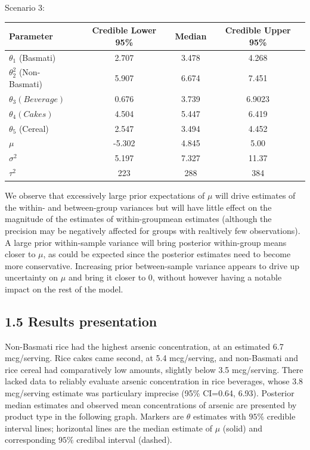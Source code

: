\documentclass[]{article}
\begin{document}
Scenario 3:

\begin{center}
  \begin{tabular}{l c c c}
  \hline Parameter & Credible Lower 95\% & Median & Credible Upper 95\% \\ \hline
    $\theta_1$ (Basmati)& 2.707 & 3.478 & 4.268\\
    $\theta_2^2$ (Non-Basmati)& 5.907 & 6.674 & 7.451 \\
    $\theta_3 (Beverage)$& 0.676 & 3.739 & 6.9023 \\
    $\theta_4 (Cakes)$& 4.504 & 5.447 & 6.419\\
    $\theta_5$ (Cereal)& 2.547 & 3.494 & 4.452\\
    $\mu$ &-5.302 & 4.845 & 5.00\\
    $\sigma^2$ &5.197 & 7.327 & 11.37\\
    $\tau^2$ &223 & 288 & 384\\ \hline
  \end{tabular}
\end{center}

We observe that excessively large prior expectations of \(\mu\) will
drive estimates of the within- and between-group variances but will have
little effect on the magnitude of the estimates of within-groupmean
estimates (although the precision may be negatively affected for groups
with realtively few observations). A large prior within-sample variance
will bring posterior within-group means closer to \(\mu\), as could be
expected since the posterior estimates need to become more conservative.
Increasing prior between-sample variance appears to drive up uncertainty
on \(\mu\) and bring it closer to \(0\), without however having a
notable impact on the rest of the model.

\subsection{1.5 Results presentation}

Non-Basmati rice had the highest arsenic concentration, at an estimated
6.7 mcg/serving. Rice cakes came second, at 5.4 mcg/serving, and
non-Basmati and rice cereal had comparatively low amounts, slightly
below 3.5 mcg/serving. There lacked data to reliably evaluate arsenic
concentration in rice beverages, whose 3.8 mcg/serving estimate was
particulary imprecise (95\% CI=0.64, 6.93). Posterior median estimates
and observed mean concentrations of arsenic are presented by product
type in the following graph. Markers are \(\theta\) estimates with
\(95\%\) credible interval lines; horizontal lines are the median
estimate of \(\mu\) (solid) and corresponding \(95\%\) credibal interval
(dashed).
\end{document}

